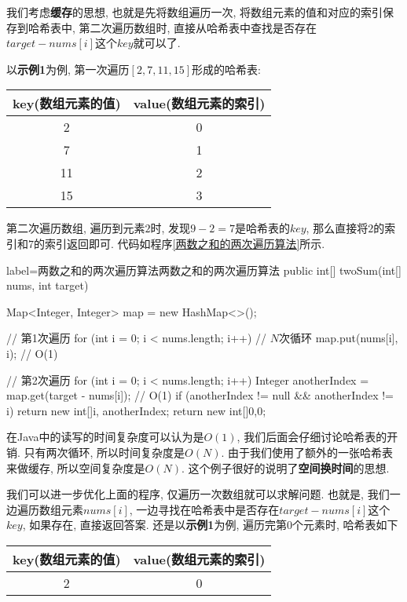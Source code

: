 \documentclass[oneside]{ctexbook}
\begin{document}
{我们考虑\textbf{缓存}的思想, 也就是先将数组遍历一次, 将数组元素的值和对应的索引保存到哈希表中, 第二次遍历数组时, 直接从哈希表中查找是否存在$target-nums[i]$这个$key$就可以了.

以\textbf{示例1}为例, 第一次遍历$[2,7,11,15]$形成的哈希表:

\begin{tabular}{|c|c|}
    \hline
    \textbf{key(数组元素的值)}  & \textbf{value(数组元素的索引)} \\\hline
    2                & 0                   \\\hline
    7                & 1                   \\\hline
    11               & 2                   \\\hline
    15               & 3                   \\\hline
\end{tabular}

第二次遍历数组, 遍历到元素$2$时, 发现$9-2=7$是哈希表的$key$, 那么直接将$2$的索引和$7$的索引返回即可. 代码如程序\ref{两数之和的两次遍历算法}所示.

\begin{myjava}{label={两数之和的两次遍历算法}}{两数之和的两次遍历算法}
public int[] twoSum(int[] nums, int target) {
    Map<Integer, Integer> map = new HashMap<>();

    // 第1次遍历
    for (int i = 0; i < nums.length; i++) { // $N$次循环
        map.put(nums[i], i); // O(1)
    }

    // 第2次遍历
    for (int i = 0; i < nums.length; i++) {
        Integer anotherIndex = map.get(target - nums[i]); // O(1)
        if (anotherIndex != null && anotherIndex != i) {
            return new int[]{i, anotherIndex};
        }
    }
    return new int[]{0,0};
}
\end{myjava}

在Java中的读写的时间复杂度可以认为是$O(1)$, 我们后面会仔细讨论哈希表的开销. 只有两次循环, 所以时间复杂度是$O(N)$. 由于我们使用了额外的一张哈希表来做缓存, 所以空间复杂度是$O(N)$. 这个例子很好的说明了\textbf{空间换时间}的思想.

我们可以进一步优化上面的程序, 仅遍历一次数组就可以求解问题. 也就是, 我们一边遍历数组元素$nums[i]$, 一边寻找在哈希表中是否存在$target-nums[i]$这个$key$, 如果存在, 直接返回答案. 还是以\textbf{示例1}为例, 遍历完第$0$个元素时, 哈希表如下

\begin{tabular}{|c|c|}
\hline
\textbf{key(数组元素的值)} & \textbf{value(数组元素的索引)} \\\hline
2                        & 0                            \\\hline 
\end{tabular}

}
\end{document}
